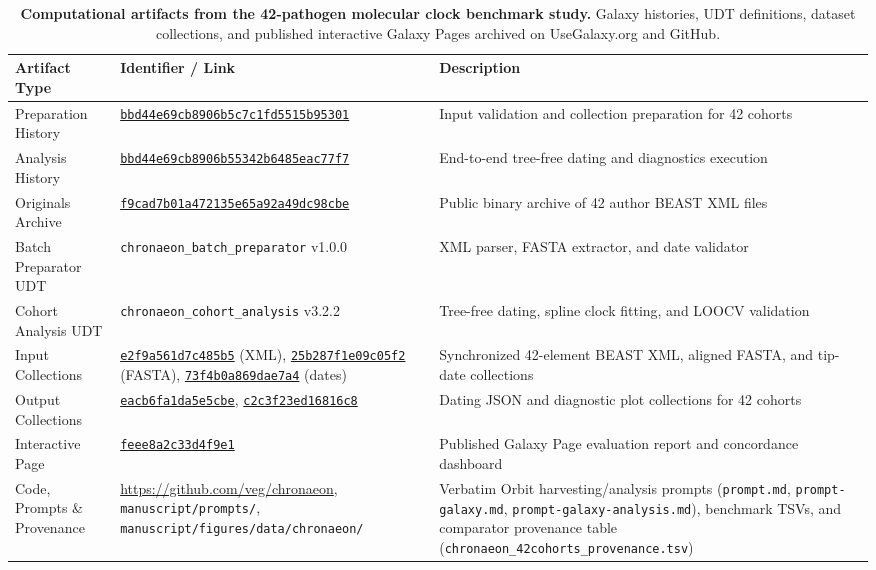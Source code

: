 \documentclass[11pt,letterpaper]{article}
\newcommand{\tool}[1]{\textsf{#1}}
\begin{document}
\clearpage

\begin{table}[!htbp]
\centering
\footnotesize
\begin{tabularx}{\textwidth}{p{}p{}X}
\toprule
\textbf{Artifact Type} & \textbf{Identifier / Link} & \textbf{Description} \\
\midrule
Preparation History & \href{https://usegalaxy.org/histories/view?id=bbd44e69cb8906b5c7c1fd5515b95301}{\texttt{bbd44e69cb8906b5c7c1fd5515b95301}} & Input validation and collection preparation for 42 cohorts \\
Analysis History & \href{https://usegalaxy.org/histories/view?id=bbd44e69cb8906b55342b6485eac77f7}{\texttt{bbd44e69cb8906b55342b6485eac77f7}} & End-to-end tree-free dating and diagnostics execution \\
Originals Archive & \href{https://usegalaxy.org/datasets/f9cad7b01a472135e65a92a49dc98cbe}{\texttt{f9cad7b01a472135e65a92a49dc98cbe}} & Public binary archive of 42 author \tool{BEAST} XML files \\
Batch Preparator UDT & \nolinkurl{chronaeon_batch_preparator} v1.0.0 & XML parser, FASTA extractor, and date validator \\
Cohort Analysis UDT & \nolinkurl{chronaeon_cohort_analysis} v3.2.2 & Tree-free dating, spline clock fitting, and LOOCV validation \\
Input Collections & \href{https://usegalaxy.org/histories/view?id=bbd44e69cb8906b5c7c1fd5515b95301}{\texttt{e2f9a561d7c485b5}} (XML), \href{https://usegalaxy.org/histories/view?id=bbd44e69cb8906b5c7c1fd5515b95301}{\texttt{25b287f1e09c05f2}} (FASTA), \href{https://usegalaxy.org/histories/view?id=bbd44e69cb8906b5c7c1fd5515b95301}{\texttt{73f4b0a869dae7a4}} (dates) & Synchronized 42-element \tool{BEAST} XML, aligned FASTA, and tip-date collections \\
Output Collections & \href{https://usegalaxy.org/histories/view?id=bbd44e69cb8906b55342b6485eac77f7}{\texttt{eacb6fa1da5e5cbe}}, \href{https://usegalaxy.org/histories/view?id=bbd44e69cb8906b55342b6485eac77f7}{\texttt{c2c3f23ed16816c8}} & Dating JSON and diagnostic plot collections for 42 cohorts \\
Interactive Page & \href{https://usegalaxy.org/published/page?id=feee8a2c33d4f9e1}{\texttt{feee8a2c33d4f9e1}} & Published Galaxy Page evaluation report and concordance dashboard \\
Code, Prompts \& Provenance & \url{https://github.com/veg/chronaeon}, \nolinkurl{manuscript/prompts/}, \nolinkurl{manuscript/figures/data/chronaeon/} & Verbatim \tool{Orbit} harvesting/analysis prompts (\nolinkurl{prompt.md}, \nolinkurl{prompt-galaxy.md}, \nolinkurl{prompt-galaxy-analysis.md}), benchmark TSVs, and comparator provenance table (\nolinkurl{chronaeon_42cohorts_provenance.tsv}) \\
\bottomrule
\end{tabularx}
\caption{\textbf{Computational artifacts from the 42-pathogen molecular clock benchmark study.} Galaxy histories, UDT definitions, dataset collections, and published interactive Galaxy Pages archived on UseGalaxy.org and GitHub.}
\label{tab:case3_artifacts}
\end{table}
\end{document}
